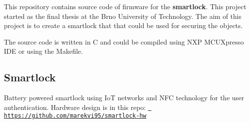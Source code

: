 This repository contains source code of firmware for the {\bfseries{smartlock}}. This project started as the final thesis at the Brno University of Technology. The aim of this project is to create a smartlock that that could be used for securing the objects.

The source code is written in C and could be compiled using N\+XP M\+C\+U\+Xpresso I\+DE or using the Makefile.

\subsection*{Smartlock}

Battery powered smartlock using IoT networks and N\+FC technology for the user authentication. Hardware design is in this repo\+: \href{https://github.com/marekvi95/smartlock-hw}{\texttt{ https\+://github.\+com/marekvi95/smartlock-\/hw}} 